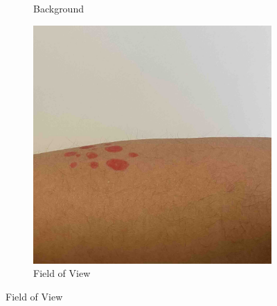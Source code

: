 \begin{figure}[ht]
\begin{subfigure}[b]{0.24\textwidth}
        \caption{Background}
        \label{fig:background}
    \end{subfigure}
    \hfill
    \begin{subfigure}[b]{0.24\textwidth}
        \includegraphics[width=\textwidth]{img/FoV.jpg}
        \caption{Field of View}
        \label{fig:FoV}
    \end{subfigure} 


\end{figure}
